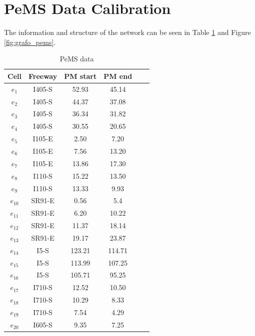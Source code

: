 \documentclass[preprint,12pt]{elsarticle}
\begin{document}
\section{PeMS Data Calibration}\label{app:pems}
		The information and structure of the network can be seen in Table \ref{tab:1} and Figure \ref{fig:grafo_pems}.
		\begin{table}
			\centering
			\begin{tabular}{cccccc}
				Cell & Freeway & PM start & PM end\\
                \hline

				$e_1$& I405-S & 52.93 & 45.14\\
				$e_2$& I405-S & 44.37 & 37.08\\
				$e_3$& I405-S & 36.34 & 31.82\\
				$e_4$& I405-S & 30.55 & 20.65\\
				$e_5$& I105-E & 2.50 & 7.20\\
				$e_6$& I105-E &7.56 & 13.20\\
				$e_7$& I105-E & 13.86 & 17.30\\
				$e_8$& I110-S & 15.22 & 13.50\\
				$e_9$& I110-S & 13.33 & 9.93\\
				$e_{10}$& SR91-E & 0.56 & 5.4\\
				$e_{11}$& SR91-E & 6.20 & 10.22\\
				$e_{12}$& SR91-E & 11.37 & 18.14\\
				$e_{13}$& SR91-E & 19.17 & 23.87\\
				$e_{14}$& I5-S & 123.21 & 114.71\\
				$e_{15}$& I5-S & 113.99 & 107.25\\
				$e_{16}$& I5-S & 105.71 & 95.25\\
				$e_{17}$& I710-S & 12.52 & 10.50\\
				$e_{18}$& I710-S & 10.29 & 8.33\\
                $e_{19}$& I710-S & 7.54 & 4.29\\
                $e_{20}$& I605-S & 9.35 & 7.25\\
				\hline
			\end{tabular}
			\caption{PeMS data}
			\label{tab:1}
		\end{table}
		
\end{document}
